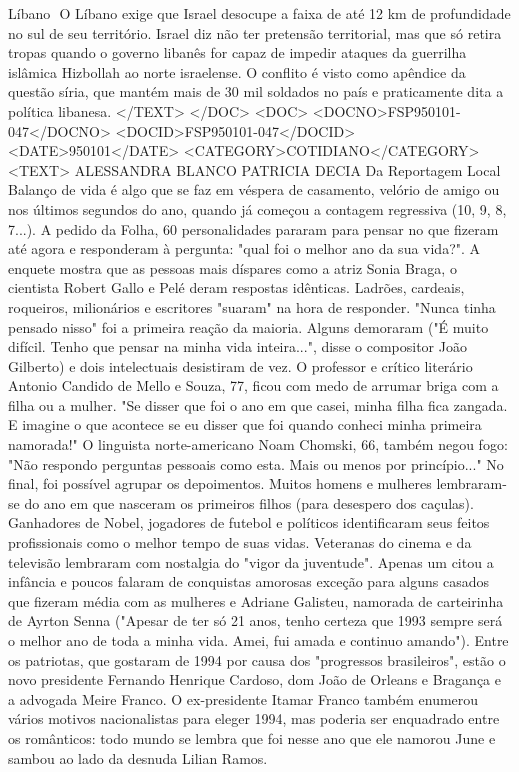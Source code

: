 Líbano  O Líbano exige que Israel desocupe a faixa de até 12 km de profundidade no sul de seu território. Israel diz não ter pretensão territorial, mas que só retira tropas quando o governo libanês for capaz de impedir ataques da guerrilha islâmica Hizbollah ao norte israelense. O conflito é visto como apêndice da questão síria, que mantém mais de 30 mil soldados no país e praticamente dita a política libanesa.
</TEXT>
</DOC>
<DOC>
<DOCNO>FSP950101-047</DOCNO>
<DOCID>FSP950101-047</DOCID>
<DATE>950101</DATE>
<CATEGORY>COTIDIANO</CATEGORY>
<TEXT>
ALESSANDRA BLANCO 
PATRICIA DECIA 
Da Reportagem Local 
Balanço de vida é algo que se faz em véspera de casamento, velório de amigo ou nos últimos segundos do ano, quando já começou a contagem regressiva (10, 9, 8, 7...). A pedido da Folha, 60 personalidades pararam para pensar no que fizeram até agora e responderam à pergunta: "qual foi o melhor ano da sua vida?".
A enquete mostra que as pessoas mais díspares como a atriz Sonia Braga, o cientista Robert Gallo e Pelé deram respostas idênticas. Ladrões, cardeais, roqueiros, milionários e escritores "suaram" na hora de responder. "Nunca tinha pensado nisso" foi a primeira reação da maioria.
Alguns demoraram ("É muito difícil. Tenho que pensar na minha vida inteira...", disse o compositor João Gilberto) e dois intelectuais desistiram de vez. O professor e crítico literário Antonio Candido de Mello e Souza, 77, ficou com medo de arrumar briga com a filha ou a mulher. "Se disser que foi o ano em que casei, minha filha fica zangada. E imagine o que acontece se eu disser que foi quando conheci minha primeira namorada!" O linguista norte-americano Noam Chomski, 66, também negou fogo: "Não respondo perguntas pessoais como esta. Mais ou menos por princípio..."
No final, foi possível agrupar os depoimentos. Muitos homens e mulheres lembraram-se do ano em que nasceram os primeiros filhos (para desespero dos caçulas).
Ganhadores de Nobel, jogadores de futebol e políticos identificaram seus feitos profissionais como o melhor tempo de suas vidas. Veteranas do cinema e da televisão lembraram com nostalgia do "vigor da juventude".
Apenas um citou a infância e poucos falaram de conquistas amorosas exceção para alguns casados que fizeram média com as mulheres e Adriane Galisteu, namorada de carteirinha de Ayrton Senna ("Apesar de ter só 21 anos, tenho certeza que 1993 sempre será o melhor ano de toda a minha vida. Amei, fui amada e continuo amando").
Entre os patriotas, que gostaram de 1994 por causa dos "progressos brasileiros", estão o novo presidente Fernando Henrique Cardoso, dom João de Orleans e Bragança e a advogada Meire Franco. O ex-presidente Itamar Franco também enumerou vários motivos nacionalistas para eleger 1994, mas poderia ser enquadrado entre os românticos: todo mundo se lembra que foi nesse ano que ele namorou June e sambou ao lado da desnuda Lilian Ramos.
